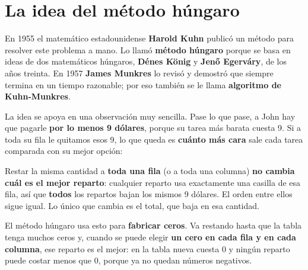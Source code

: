 \documentclass[11pt,a4paper]{article}
\newcommand{\marco}[3]{%
  \foreach \i in {2,...,#2} \foreach \j in {2,...,#3}
    \draw[gray!60, very thin] (#1-\i-\j.north west) rectangle (#1-\i-\j.south east);
  \draw[semithick] (#1-2-2.north west) rectangle (#1-#2-#3.south east);}
\newcommand{\cero}[1]{\node[asig] at (#1) {};}
\newcommand{\flecha}[3]{\draw[-{Stealth[length=2.4mm]}, thick] (#1.east) -- node[above, font=\scriptsize, align=center] {#3} (#1.east -| #2.west);}
\begin{document}
\section{La idea del método húngaro}

En 1955 el matemático estadounidense \textbf{Harold Kuhn} publicó un método para resolver este problema a mano.
Lo llamó \textbf{método húngaro} porque se basa en ideas de dos matemáticos húngaros, \textbf{Dénes König} y
\textbf{Jenő Egerváry}, de los años treinta. En 1957 \textbf{James Munkres} lo revisó y demostró que siempre
termina en un tiempo razonable; por eso también se le llama \textbf{algoritmo de Kuhn-Munkres}.

La idea se apoya en una observación muy sencilla. Pase lo que pase, a John hay que pagarle \textbf{por lo menos
9 dólares}, porque su tarea más barata cuesta 9. Si a toda su fila le quitamos esos 9, lo que queda es
\textbf{cuánto más cara} sale cada tarea comparada con su mejor opción:

\begin{center}
\end{center}

Restar la misma cantidad a \textbf{toda una fila} (o a toda una columna) \textbf{no cambia cuál es el mejor reparto}:
cualquier reparto usa exactamente una casilla de esa fila, así que \textbf{todos} los repartos bajan los mismos
9 dólares. El orden entre ellos sigue igual. Lo único que cambia es el total, que baja en esa cantidad.

El método húngaro usa esto para \textbf{fabricar ceros}. Va restando hasta que la tabla tenga muchos ceros y,
cuando se puede elegir \textbf{un cero en cada fila y en cada columna}, ese reparto es el mejor: en la tabla nueva
cuesta 0 y ningún reparto puede costar menos que 0, porque ya no quedan números negativos.
\end{document}
